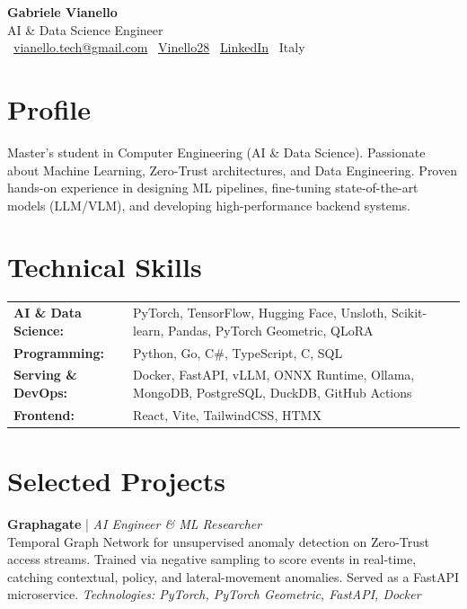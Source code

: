 \documentclass[a4paper,10pt]{article}
\newcommand{\projectentry}[3]{
  \noindent\textbf{#1} | \textit{#2}\\
  #3\vspace{0.3em}
}
\begin{document}
\begin{center}
  {\Huge\bfseries Gabriele Vianello} \\[0.5em]
  {\Large\color{accent} AI \& Data Science Engineer} \\[0.5em]
  \faEnvelope~\href{mailto:vianello.tech@gmail.com}{vianello.tech@gmail.com} \quad
  \faGithub~\href{https://github.com/Vinello28}{Vinello28} \quad
  \faLinkedin~\href{https://www.linkedin.com/in/gabriele-vianello-476a331a1}{LinkedIn} \quad
  \faMapMarker~Italy
\end{center}

\vspace{0.5em}

\section{Profile}
Master's student in Computer Engineering (AI \& Data Science). Passionate about Machine Learning, Zero-Trust architectures, and Data Engineering. Proven hands-on experience in designing ML pipelines, fine-tuning state-of-the-art models (LLM/VLM), and developing high-performance backend systems.

\section{Technical Skills}
\begin{tabularx}{\textwidth}{@{}l X@{}}
  \textbf{AI \& Data Science:} & PyTorch, TensorFlow, Hugging Face, Unsloth, Scikit-learn, Pandas, PyTorch Geometric, QLoRA \\
  \textbf{Programming:} & Python, Go, C\#, TypeScript, C, SQL \\
  \textbf{Serving \& DevOps:} & Docker, FastAPI, vLLM, ONNX Runtime, Ollama, MongoDB, PostgreSQL, DuckDB, GitHub Actions \\
  \textbf{Frontend:} & React, Vite, TailwindCSS, HTMX \\
\end{tabularx}

\section{Selected Projects}

\projectentry{Graphagate}{AI Engineer \& ML Researcher}{Temporal Graph Network for unsupervised anomaly detection on Zero-Trust access streams. Trained via negative sampling to score events in real-time, catching contextual, policy, and lateral-movement anomalies. Served as a FastAPI microservice. \textit{Technologies: PyTorch, PyTorch Geometric, FastAPI, Docker}}
\end{document}
